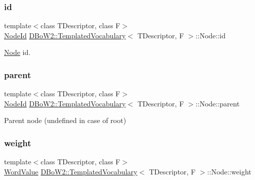 \subsubsection{\texorpdfstring{id}{id}}
{\footnotesize\ttfamily template$<$class T\+Descriptor, class F$>$ \\
\mbox{\hyperlink{namespace_d_bo_w2_a3a0fa9c50c0df508759362d6204566f2}{Node\+Id}} \mbox{\hyperlink{class_d_bo_w2_1_1_templated_vocabulary}{D\+Bo\+W2\+::\+Templated\+Vocabulary}}$<$ T\+Descriptor, F $>$\+::Node\+::id}



\mbox{\hyperlink{struct_d_bo_w2_1_1_templated_vocabulary_1_1_node}{Node}} id. 

\mbox{\label{struct_d_bo_w2_1_1_templated_vocabulary_1_1_node_a082fba9dcf272b78354ffd5b1d58f5fa}} 
\subsubsection{\texorpdfstring{parent}{parent}}
{\footnotesize\ttfamily template$<$class T\+Descriptor, class F$>$ \\
\mbox{\hyperlink{namespace_d_bo_w2_a3a0fa9c50c0df508759362d6204566f2}{Node\+Id}} \mbox{\hyperlink{class_d_bo_w2_1_1_templated_vocabulary}{D\+Bo\+W2\+::\+Templated\+Vocabulary}}$<$ T\+Descriptor, F $>$\+::Node\+::parent}



Parent node (undefined in case of root) 

\mbox{\label{struct_d_bo_w2_1_1_templated_vocabulary_1_1_node_ae1e261135cb7af400f1c4c4795cdba41}} 
\subsubsection{\texorpdfstring{weight}{weight}}
{\footnotesize\ttfamily template$<$class T\+Descriptor, class F$>$ \\
\mbox{\hyperlink{namespace_d_bo_w2_a55fcd7333e591a38e96b91f41bc182f6}{Word\+Value}} \mbox{\hyperlink{class_d_bo_w2_1_1_templated_vocabulary}{D\+Bo\+W2\+::\+Templated\+Vocabulary}}$<$ T\+Descriptor, F $>$\+::Node\+::weight}




